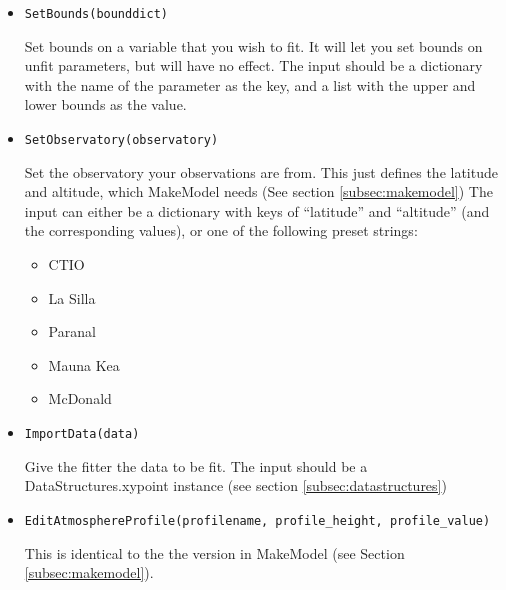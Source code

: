 \documentclass{article}
\begin{document}
\begin{itemize}
  \item \begin{Verbatim}[commandchars=\\\{\}]
SetBounds(bounddict)
    \end{Verbatim}
    Set bounds on a variable that you wish to fit. It will let you set bounds on unfit parameters, but will have no effect. The input should be a dictionary with the name of the parameter as the key, and a list with the upper and lower bounds as the value.
    
  \item \begin{Verbatim}[commandchars=\\\{\}]
SetObservatory(observatory)
    \end{Verbatim}
    Set the observatory your observations are from. This just defines the latitude and altitude, which MakeModel needs (See section \ref{subsec:makemodel})
    The input can either be a dictionary with keys of ``latitude'' and ``altitude'' (and the corresponding values), or one of the following preset strings:
    \begin{itemize}
      \item CTIO
      \item La Silla
      \item Paranal
      \item Mauna Kea
      \item McDonald
    \end{itemize}
    
  \item \begin{Verbatim}[commandchars=\\\{\}]
ImportData(data)
    \end{Verbatim}
    Give the fitter the data to be fit. The input should be a DataStructures.xypoint instance (see section \ref{subsec:datastructures})
  
  \item \begin{Verbatim}[commandchars=\\\{\}]
EditAtmosphereProfile(profilename, profile_height, profile_value)
    \end{Verbatim}
    This is identical to the the version in MakeModel (see Section \ref{subsec:makemodel}).
    

\end{itemize}
\end{document}
